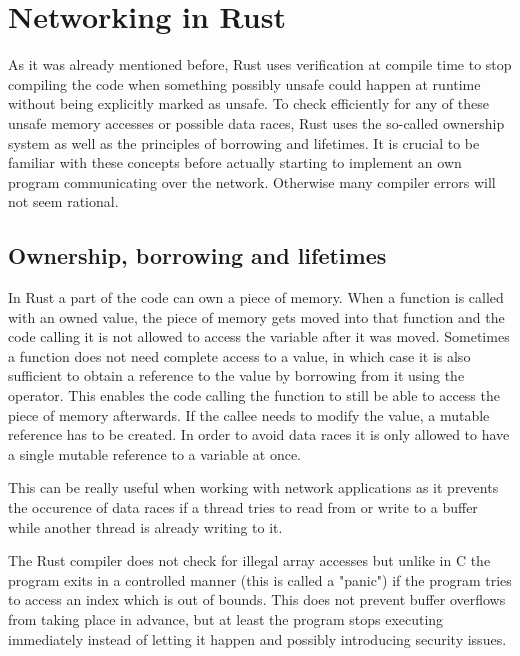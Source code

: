 
\section{Networking in Rust} \label{networking-in-rust}
As it was already mentioned before, Rust uses verification at compile time to stop compiling the code when something
possibly unsafe could happen at runtime without being explicitly marked as unsafe. To check efficiently for any of
these unsafe memory accesses or possible data races, Rust uses the so-called ownership system as well as the principles
of borrowing and lifetimes. It is crucial to be familiar with these concepts before actually starting to implement an
own program communicating over the network. Otherwise many compiler errors will not seem rational.

\subsection{Ownership, borrowing and lifetimes}
In Rust a part of the code can own a piece of memory. When a function is called with an owned value, the piece of
memory gets moved into that function and the code calling it is not allowed to access the variable after it was moved.
Sometimes a function does not need complete access to a value, in which case it is also sufficient to obtain a
reference to the value by borrowing from it using the \rust{&} operator. This enables the code calling the function to
still be able to access the piece of memory afterwards. If the callee needs to modify the value, a mutable reference
has to be created. In order to avoid data races it is only allowed to have a single mutable reference to a variable at
once.

This can be really useful when working with network applications as it prevents the occurence of data races if a thread
tries to read from or write to a buffer while another thread is already writing to it.

The Rust compiler does not check for illegal array accesses but unlike in C the program exits in a controlled manner
(this is called a "panic") if the program tries to access an index which is out of bounds. This does not prevent buffer
overflows from taking place in advance, but at least the program stops executing immediately instead of letting it
happen and possibly introducing security issues.


